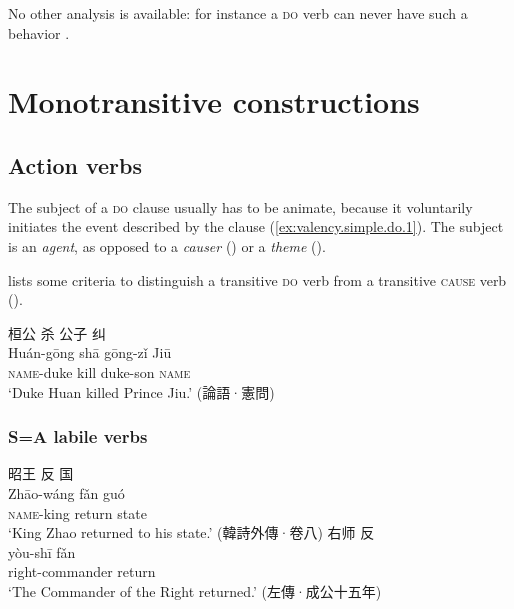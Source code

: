 \documentclass[UTF8, a4paper, oneside, scheme=plain, 12pt]{ctexrep}
\newcommand*{\citepage}[1]{p.~{#1}}
\newcommand*{\term}[1]{\emph{#1}}
\newcommand{\translate}[1]{`#1'}
\newcommand*{\category}[1]{\textsc{#1}}
\begin{document}
No other analysis is available: for instance a \category{do} verb can never have such a behavior
\citep[\citepage{351}]{meiguang2018}.



\section{Monotransitive constructions}

\subsection{Action verbs}
\label{sec:valency.simple.do}

The subject of a \category{do} clause usually has to be animate,
because it voluntarily initiates the event described by the clause
(\ref{ex:valency.simple.do.1}).
The subject is an \term{agent}, as opposed to a \term{causer} ()
or a \term{theme} ().

\citet[\citepage{272}]{meiguang2018} lists some criteria
to distinguish a transitive \category{do} verb 
from a transitive \category{cause} verb
().

\begin{exe}
    \ex\label{ex:valency.simple.do.1}
    \glll 桓公 杀 公子 纠 \\
    Huán-gōng shā gōng-zǐ Jiū \\
    \category{name}-duke kill duke-son \category{name} \\
    \glt\translate{Duke Huan killed Prince Jiu.} \hfill (論語·憲問)
\end{exe}

\subsubsection{S=A labile verbs}\label{sec:valency.monotransitive.s-a}

\begin{exe}
    \ex\label{ex:grammatical.clause.argument.do-shift.transitive.1}
    \glll 昭王 反 国 \\
    Zhāo-wáng fǎn guó \\
    \category{name}-king return state \\
    \glt\translate{King Zhao returned to his state.} \hfill (韓詩外傳·卷八)
    \ex\label{ex:grammatical.clause.argument.do-shift.intransitive.1}
    \glll 右师 反 \\
    yòu-shī fǎn \\
    right-commander return \\
    \glt\translate{The Commander of the Right returned.} \hfill (左傳·成公十五年)
\end{exe}
\end{document}
